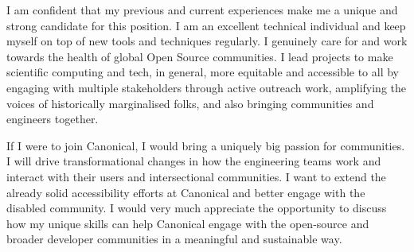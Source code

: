 I am confident that my previous and current experiences make me a unique and strong candidate for this position. I am an excellent technical individual and keep myself on top of new tools and techniques regularly. I genuinely care for and work towards the health of global Open Source communities. I lead projects to make scientific computing and tech, in general, more equitable and accessible to all by engaging with multiple stakeholders through active outreach work, amplifying the voices of historically marginalised folks,  and also bringing communities and engineers together. 

If I were to join Canonical, I would bring a uniquely big passion for communities. I will drive transformational changes in how the engineering teams work and interact with their users and intersectional communities. I want to extend the already solid accessibility efforts at Canonical and better engage with the disabled community. I would very much appreciate the opportunity to discuss how my unique skills can help Canonical engage with the open-source and broader developer communities in a meaningful and sustainable way.





